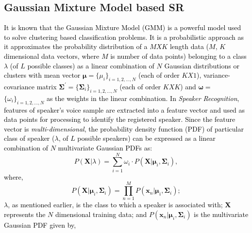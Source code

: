 \documentclass{article}
\begin{document}
{\subsection{Gaussian Mixture Model based SR} 
\textcolor{black}{It is known that the Gaussian Mixture Model (GMM) is a 
powerful model used to solve clustering based classification problems.  
It is a probabilistic approach as it approximates the probability distribution of a $M X K$ length data ($M$, $K$ dimensional data vectors, where $M$ is number of data points) belonging to a class $\lambda$ (of $L$ possible classes) as a linear combination of $ N$ Gaussian distributions or clusters %
with mean vector $\bm \mu$$=$$\{\mu_i\}_{i=1,2,\ldots,N}$ (each of order $K$$X$$1$), variance-covariance \textcolor{black}{matrix} %
$\bm \Sigma^\prime$$=$$\{\bm\Sigma_i\}_{i=1,2,\ldots,N}$ (each of order $K$$X$$K$) and $\bm \omega$$=$$\{\omega_i\}_{i=1,2,\ldots,N}$  as the weights in the linear combination.} \textcolor{black}{In 
\textit{Speaker Recognition}, features of speaker's voice sample 
are extracted into a feature vector and used as data points for processing to identify the registered speaker. %
Since the feature vector is \textit{multi-dimensional}, %
the probability density function (PDF) 
of particular class of speaker ($\lambda$, of $L$ possible speakers) can be expressed as a linear combination of $N$ multivariate Gaussian PDFs \cite{5} as:
\begin{equation}
P(\bm X\vert\lambda) = \sum\limits_{i=1}^N \omega_i \cdot P(\bm X|\bm \mu_i,\bm \Sigma_i)
\label{eq1},
\end{equation}
where,
\begin{equation}
P(\bm X|\bm \mu_i,\bm \Sigma_i) = \prod\limits_{n=1}^{M} P(\bm x_n|\bm \mu_i,\bm \Sigma_i);
\end{equation}
\textbf{$\lambda$}, as mentioned earlier, is the class to which a speaker is associated with; $\bm X$ represents the $N$ dimensional training data; and $P(\bm x_n|\bm\mu_i,\bm\Sigma_i)$ is the multivariate Gaussian PDF given by,%
}}
\end{document}
